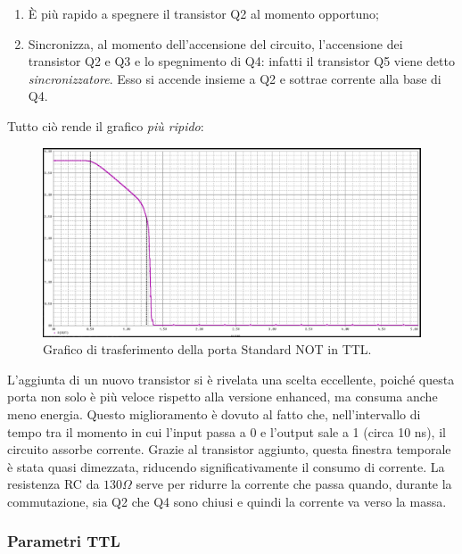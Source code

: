 \documentclass[
]{book}
\providecommand{\tightlist}{%
  \setlength{\itemsep}{0pt}\setlength{\parskip}{0pt}}
\begin{document}
\begin{enumerate}
\def\labelenumi{\arabic{enumi})}
\tightlist
\item
  È più rapido a spegnere il transistor Q2 al momento opportuno;
\item
  Sincronizza, al momento dell'accensione del circuito, l'accensione dei
  transistor Q2 e Q3 e lo spegnimento di Q4: infatti il transistor Q5
  viene detto \emph{sincronizzatore}. Esso si accende insieme a Q2 e
  sottrae corrente alla base di Q4.
\end{enumerate}

Tutto ciò rende il grafico \emph{più ripido}:

\begin{figure}
\centering
\includegraphics[width=0.5\linewidth,height=\textheight,keepaspectratio]{assets/imgs/standard_not.png}
\caption{Grafico di trasferimento della porta Standard NOT in TTL.}
\end{figure}

L'aggiunta di un nuovo transistor si è rivelata una scelta eccellente,
poiché questa porta non solo è più veloce rispetto alla versione
enhanced, ma consuma anche meno energia. Questo miglioramento è dovuto
al fatto che, nell'intervallo di tempo tra il momento in cui l'input
passa a 0 e l'output sale a 1 (circa 10 ns), il circuito assorbe
corrente. Grazie al transistor aggiunto, questa finestra temporale è
stata quasi dimezzata, riducendo significativamente il consumo di
corrente. La resistenza RC da \(130\Omega\) serve per ridurre la
corrente che passa quando, durante la commutazione, sia Q2 che Q4 sono
chiusi e quindi la corrente va verso la massa.

\subsubsection{Parametri TTL}\label{parametri-ttl}
\end{document}
